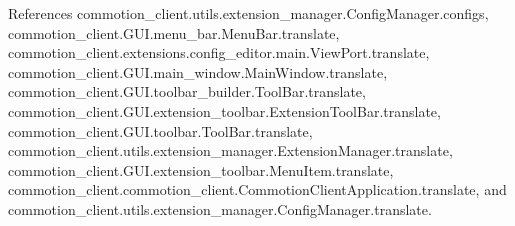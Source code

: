 References commotion\+\_\+client.\+utils.\+extension\+\_\+manager.\+Config\+Manager.\+configs, commotion\+\_\+client.\+G\+U\+I.\+menu\+\_\+bar.\+Menu\+Bar.\+translate, commotion\+\_\+client.\+extensions.\+config\+\_\+editor.\+main.\+View\+Port.\+translate, commotion\+\_\+client.\+G\+U\+I.\+main\+\_\+window.\+Main\+Window.\+translate, commotion\+\_\+client.\+G\+U\+I.\+toolbar\+\_\+builder.\+Tool\+Bar.\+translate, commotion\+\_\+client.\+G\+U\+I.\+extension\+\_\+toolbar.\+Extension\+Tool\+Bar.\+translate, commotion\+\_\+client.\+G\+U\+I.\+toolbar.\+Tool\+Bar.\+translate, commotion\+\_\+client.\+utils.\+extension\+\_\+manager.\+Extension\+Manager.\+translate, commotion\+\_\+client.\+G\+U\+I.\+extension\+\_\+toolbar.\+Menu\+Item.\+translate, commotion\+\_\+client.\+commotion\+\_\+client.\+Commotion\+Client\+Application.\+translate, and commotion\+\_\+client.\+utils.\+extension\+\_\+manager.\+Config\+Manager.\+translate.


